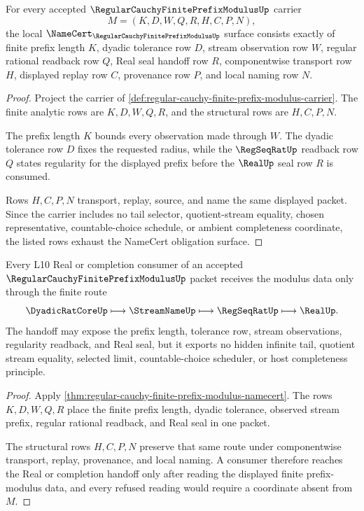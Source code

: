 \begin{theorem}
\label{thm:regular-cauchy-finite-prefix-modulus-namecert}
For every accepted $\RegularCauchyFinitePrefixModulusUp$ carrier
$$
M=(K,D,W,Q,R,H,C,P,N),
$$
the local $\NameCert_{\RegularCauchyFinitePrefixModulusUp}$ surface consists exactly of finite prefix length $K$, dyadic tolerance row $D$, stream observation row $W$, regular rational readback row $Q$, Real seal handoff row $R$, componentwise transport row $H$, displayed replay row $C$, provenance row $P$, and local naming row $N$.
\end{theorem}
\begin{proof}
Project the carrier of \autoref{def:regular-cauchy-finite-prefix-modulus-carrier}. The finite analytic rows are $K,D,W,Q,R$, and the structural rows are $H,C,P,N$.

The prefix length $K$ bounds every observation made through $W$. The dyadic tolerance row $D$ fixes the requested radius, while the $\RegSeqRatUp$ readback row $Q$ states regularity for the displayed prefix before the $\RealUp$ seal row $R$ is consumed.

Rows $H,C,P,N$ transport, replay, source, and name the same displayed packet. Since the carrier includes no tail selector, quotient-stream equality, chosen representative, countable-choice schedule, or ambient completeness coordinate, the listed rows exhaust the NameCert obligation surface.
\end{proof}

\begin{theorem}
\label{thm:regular-cauchy-finite-prefix-modulus-l10-handoff}
Every L10 Real or completion consumer of an accepted $\RegularCauchyFinitePrefixModulusUp$ packet receives the modulus data only through the finite route
$$
\DyadicRatCoreUp\longmapsto\StreamNameUp\longmapsto\RegSeqRatUp\longmapsto\RealUp .
$$
The handoff may expose the prefix length, tolerance row, stream observations, regularity readback, and Real seal, but it exports no hidden infinite tail, quotient stream equality, selected limit, countable-choice scheduler, or host completeness principle.
\end{theorem}
\begin{proof}
Apply \autoref{thm:regular-cauchy-finite-prefix-modulus-namecert}. The rows $K,D,W,Q,R$ place the finite prefix length, dyadic tolerance, observed stream prefix, regular rational readback, and Real seal in one packet.

The structural rows $H,C,P,N$ preserve that same route under componentwise transport, replay, provenance, and local naming. A consumer therefore reaches the Real or completion handoff only after reading the displayed finite prefix-modulus data, and every refused reading would require a coordinate absent from $M$.
\end{proof}


